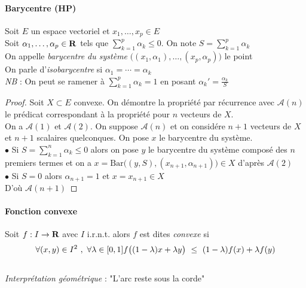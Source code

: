     \paragraph{Barycentre (HP)}
        Soit $E$ un espace vectoriel et $x_1,\dots ,x_p \in E$ \\
        Soit $\alpha_1 ,\dots ,\alpha_p\in {\mathbf{R}}$ tels que $\sum_{k=1}^p \alpha_k \leqslant 0$. On note $S = \sum_{k=1}^p \alpha_k$\\
        On appelle \emph{barycentre du système} $\big( (x_1,\alpha_1) ,\dots ,(x_p,\alpha_p) \big)$ le point 
        \\
        On parle d'\emph{isobarycentre} si $\alpha_1 = \cdots = \alpha_k$ \trait \vspace*{-1.1cm}
        \\ {\small \emph{NB} : On peut se ramener à $\sum_{k=1}^p \alpha_k=1$ en posant $\alpha_k'=\frac{\alpha_k}{S}$}
    \vspace*{0.5cm} \\ 
    \begin{proof}
    Soit $X\subset E$ convexe. On démontre la propriété par récurrence avec $\mathcal{A}(n)$ le prédicat correspondant à la propriété 
    pour $n$ vecteurs de $X$. \\
    On a $\mathcal{A}(1)$ et $\mathcal{A}(2)$. On suppose $\mathcal{A}(n)$ et on considére $n+1$ vecteurs de $X$ et $n+1$ scalaires 
    quelconques. On pose $x$ le barycentre du système. \\
    $\bullet $ Si $S = \sum_{k=1}^n \alpha_k \leqslant 0$ alors on pose $y$ le barycentre du système composé des $n$ premiers termes et on a 
    $x= \mathrm{Bar} \big( (y,S),(x_{n+1},\alpha_{n+1}) \big) \in X$ d'après $\mathcal{A}(2)$ \\
    $\bullet $ Si $S=0$ alors $\alpha_{n+1} = 1$ et $x=x_{n+1} \in X$ \\
    D'où $\mathcal{A}(n+1)$
    \end{proof} \traitd
    \paragraph{Fonction convexe}
        Soit $f:I\rightarrow {\mathbf{R}}$ avec $I$ i.r.n.t. alors $f$ est dites \emph{convexe} si 
        \[\forall (x,y) \in I^2 ~,~\forall \lambda\in [0,1] \\ f\big( (1-\lambda )x + \lambda y \big) ~\leq ~
        (1-\lambda )f(x) + \lambda f(y)\] \trait \vspace*{-1.2cm} \\
    {\small \emph{Interprétation géométrique} : "L'arc reste sous la corde"} \traitd
